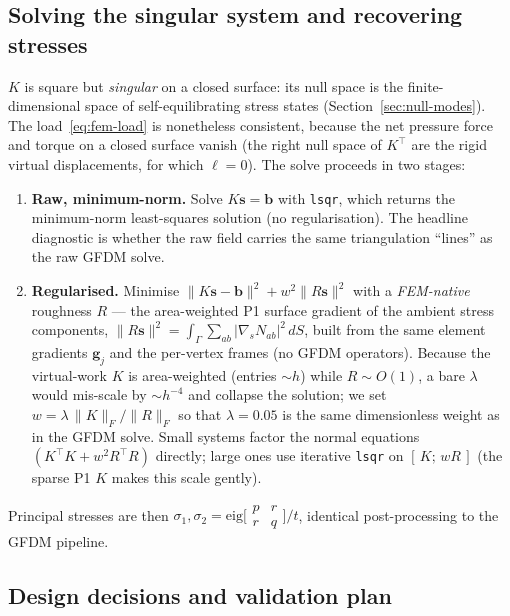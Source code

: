 \documentclass[11pt]{article}
\newcommand{\vv}[1]{\bm{#1}}          %
\begin{document}
\subsection{Solving the singular system and recovering stresses}
\label{sec:fem-solve}

$K$ is square but \emph{singular} on a closed surface: its null space is the
finite-dimensional space of self-equilibrating stress states
(Section~\ref{sec:null-modes}).  The load~\eqref{eq:fem-load} is nonetheless
consistent, because the net pressure force and torque on a closed surface vanish
(the right null space of $K^\top$ are the rigid virtual displacements, for which
$\ell=0$).  The solve proceeds in two stages:
\begin{enumerate}[label=(\roman*),nosep]
  \item \textbf{Raw, minimum-norm.}  Solve $K\vv s=\vv b$ with \texttt{lsqr},
        which returns the minimum-norm least-squares solution (no regularisation).
        The headline diagnostic is whether the raw field carries the same
        triangulation ``lines'' as the raw GFDM solve.
  \item \textbf{Regularised.}  Minimise $\|K\vv s-\vv b\|^2+w^2\|R\vv s\|^2$ with a
        \emph{FEM-native} roughness $R$ --- the area-weighted P1 surface gradient
        of the ambient stress components, $\|R\vv s\|^2=\int_\Gamma\sum_{ab}
        |\nabla_s N_{ab}|^2\,dS$, built from the same element gradients $\vv g_j$
        and the per-vertex frames (no GFDM operators).  Because the virtual-work
        $K$ is area-weighted (entries ${\sim}h$) while $R\sim O(1)$, a bare
        $\lambda$ would mis-scale by ${\sim}h^{-4}$ and collapse the solution; we
        set $w=\lambda\,\|K\|_F/\|R\|_F$ so that $\lambda=0.05$ is the same
        dimensionless weight as in the GFDM solve.  Small systems factor the normal
        equations $(K^\top K+w^2R^\top R)$ directly; large ones use iterative
        \texttt{lsqr} on $[\,K;\,wR\,]$ (the sparse P1 $K$ makes this scale gently).
\end{enumerate}
Principal stresses are then $\sigma_1,\sigma_2 = \mathrm{eig}
\bigl[\begin{smallmatrix}p&r\\ r&q\end{smallmatrix}\bigr]/t$, identical
post-processing to the GFDM pipeline.

\subsection{Design decisions and validation plan}
\label{sec:fem-decisions}
\end{document}
